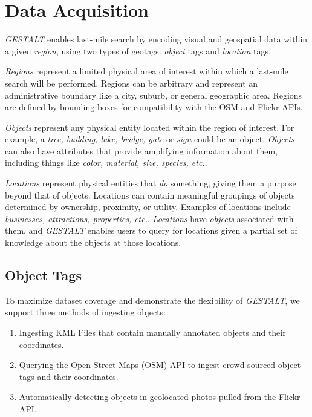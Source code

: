\section{Data Acquisition}
\label{section:data}

\emph{GESTALT} enables last-mile search by encoding visual and geospatial data within a given \emph{region}, using two types of geotags: \emph{object} tags and \emph{location} tags.

\emph{Regions} represent a limited physical area of interest within which a last-mile search will be performed. 
Regions can be arbitrary and represent an administrative boundary like a city, suburb, or general geographic area.
Regions are defined by bounding boxes for compatibility with the OSM and Flickr APIs.

\emph{Objects} represent any physical entity located within the region of interest. 
For example, a \textit{tree, building, lake, bridge, gate} or \textit{sign} could be an object. 
\textit{Objects} can also have attributes that provide amplifying information about them, including things like \textit{color, material, size, species, etc.}. 

\emph{Locations} represent physical entities that \textit{do} something, giving them a purpose beyond that of objects. 
Locations can contain meaningful groupings of objects determined by ownership, proximity, or utility. 
Examples of locations include \textit{businesses, attractions, properties, etc.}. 
\textit{Locations} have \textit{objects} associated with them, and \emph{GESTALT} enables users to query for locations given a partial set of knowledge about the objects at those locations.

\subsection{Object Tags}
To maximize dataset coverage and demonstrate the flexibility of \emph{GESTALT}, we support three methods of ingesting objects:
\begin{enumerate}
    \item Ingesting KML Files that contain manually annotated objects and their coordinates.
    \item Querying the Open Street Maps (OSM) API to ingest crowd-sourced object tags and their coordinates.
    \item Automatically detecting objects in geolocated photos pulled from the Flickr API. 
\end{enumerate}

